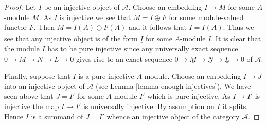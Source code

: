 \documentclass{stacks-project}
\theoremstyle{plain}
\theoremstyle{definition}
\theoremstyle{remark}
\numberwithin{equation}{subsection}
\begin{document}
\begin{proof}
Let $I$ be an injective object of $\mathcal{A}$.
Choose an embedding $I \to \underline{M}$ for some $A$-module $M$.
As $I$ is injective we see that $\underline{M} = I \oplus F$ for some
module-valued functor $F$. Then $M = I(A) \oplus F(A)$ and it follows
that $I = \underline{I(A)}$. Thus we see that any injective object
is of the form $\underline{I}$ for some $A$-module $I$.
It is clear that the module $I$ has to be pure injective
since any universally exact sequence $0 \to M \to N \to L \to 0$
gives rise to an exact sequence
$0 \to \underline{M} \to \underline{N} \to \underline{L} \to 0$
of $\mathcal{A}$.

\medskip\noindent
Finally, suppose that $I$ is a pure injective
$A$-module. Choose an embedding $\underline{I} \to J$
into an injective object of $\mathcal{A}$ (see
Lemma \ref{lemma-enough-injectives}).
We have seen above that $J = \underline{I'}$
for some $A$-module $I'$ which is pure injective. As
$\underline{I} \to \underline{I'}$ is injective
the map $I \to I'$ is universally injective. By assumption on $I$
it splits. Hence $\underline{I}$ is a summand of $J = \underline{I'}$
whence an injective object of the category $\mathcal{A}$.
\end{proof}
\end{document}
